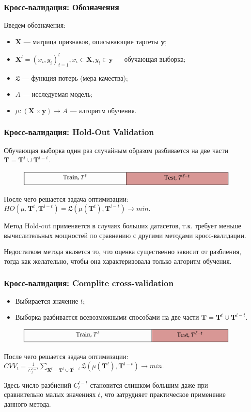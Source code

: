 \documentclass[11pt]{beamer}
\begin{document}
	\begin{frame}
		\frametitle{Кросс-валидация: Обозначения}
		Введем обозначения:
		\begin{itemize}
			\item $\bm{X}$ --- матрица признаков, описывающие таргеты $\bm{y}$;
			\item $\bm{X}^l = (x_i, y_i)_{i=1}^l, x_i \in \bm{X}, y_i \in \bm{y}$ --- обучающая выборка;
			\item $\mathfrak{L}$ --- функция потерь (мера качества);
			\item $A$ --- исследуемая модель;
			\item $\mu : (\bm{X}\times\bm{y})\rightarrow A$ --- алгоритм обучения.
		\end{itemize}
	\end{frame}
	\begin{frame}
		\frametitle{Кросс-валидация: Hold-Out Validation}
		Обучающая выборка один раз случайным образом разбивается на две части $\bm{T} = \bm{T}^t \cup \bm{T}^{l-t}$.
		\begin{figure}
			\includegraphics[width=1\linewidth]{imgs/hold-out}
		\end{figure}
		После чего решается задача оптимизации:
		$HO(\mu, \bm{T}^t, \bm{T}^{l-t}) = \mathfrak{L}(\mu(\bm{T}^t), \bm{T}^{l-t}) \rightarrow min$.
		
		
		Метод Hold-out применяется в случаях больших датасетов, т.к. требует меньше вычислительных мощностей по сравнению с другими методами кросс-валидации. 
		
		Недостатком метода является то, что оценка существенно зависит от разбиения, тогда как желательно, чтобы она характеризовала только алгоритм обучения.
	\end{frame}

	\begin{frame}
		\frametitle{Кросс-валидация: Complite cross-validation}
		\begin{itemize}
			\item Выбирается значение $t$;
			\item Выборка разбивается всевозможными способами на две части $\bm{T} = \bm{T}^t \cup \bm{T}^{l-t}$.
		\end{itemize}
		\begin{figure}
			\includegraphics[width=1\linewidth]{imgs/completecrossvalidation}
		\end{figure}
		После чего решается задача оптимизации:
		$CVV_t = \frac{1}{C_l^{l-t}}\sum\limits_{\bm{X}^l = \bm{T}^t \cup \bm{T}^{l-t}} \mathfrak{L}(\mu(\bm{T}^t), \bm{T}^{l-t}) \rightarrow min$.
		
		
		Здесь число разбиений $ C_l^{l-t} $ становится слишком большим даже при сравнительно малых значениях $ t $, что затрудняет практическое применение данного метода.
	\end{frame}
\end{document}

